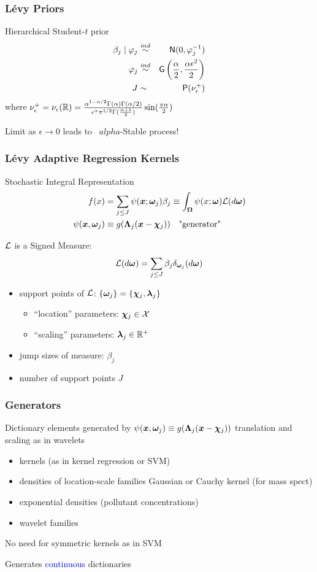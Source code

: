 \documentclass[dvips]{beamer}
\newcommand{\bs}[2]{\begin{frame} \frametitle{#1} 
{#2}
\end{frame} }
\newcommand{\blue}{\textcolor{Blue}}
\begin{document}
\bs{L\'evy Priors} {
Hierarchical Student-$t$ prior
\begin{eqnarray*}
  \beta_j \mid \varphi_j & \mathrel{\mathop{\sim}\limits^{\mathit{ind}}} & \textsf{N}(0,  \varphi_j^{-1}) \\
  \varphi_j    & \mathrel{\mathop{\sim}\limits^{\mathit{ind}}} & \mbox{\sf G}\left(\frac{\alpha}{2}, \frac{\alpha \epsilon^2}{2}\right) \\
   J & \sim & \mbox{\sf P}(\nu^+_\epsilon)
\end{eqnarray*}
where $\nu^+_\epsilon = \nu_\epsilon(\mathbb{R}) = \frac{\alpha ^{1
    - \alpha/2} \Gamma(\alpha)\Gamma(\alpha/2)}{\epsilon^\alpha
  \pi^{1/2} \Gamma(\frac{\alpha +1}{2})} \sin(\frac{\pi \alpha} {2})$

\vspace{.5in}
Limit as $\epsilon \to 0$ leads to \Levy\ $alpha$-Stable process!
}

\bs{L\'evy Adaptive Regression Kernels} {
Stochastic Integral Representation 
\begin{align*}
f(x)   & =   \sum_{j\le J}\psi(\bm x; \bm \omega_j) \beta_j \equiv \int_{\bm \Omega}  
\psi(x;\bm \omega) {\cal L}(d\bm \omega) \\
\psi(\bm x,\bm \omega_j) & \equiv g( \bm \Lambda_j (\bm x - \bm \chi_j))
\quad \text{"generator"}
\end{align*} 


${\cal L}$ is a Signed Measure:
$${\cal L}(d\bm \omega)  = \sum_{j\le J} \beta_j \delta_{\bm \omega_j}(d\bm \omega) $$

  \begin{itemize}
 
  \item  support points of ${\cal L}$: $\{\bm \omega_j\} = \{\bm \chi_j,\bm \lambda_j\}$ 
    \begin{itemize}
    \item``location'' parameters:  $\bm \chi_j\in\mathcal{X}$  
    \item ``scaling'' parameters:  $\bm \lambda_j\in\mathbb{R}^+$  
    \end{itemize} 
  \item jump sizes of measure:  $\beta_j$   
  \item number of support points  $J$ 
  \end{itemize}
} 

\bs{Generators} {
Dictionary elements generated by $\psi(\bm x,\bm \omega_j)  \equiv g(
\bm \Lambda_j (\bm x - \bm \chi_j))$ translation and scaling as in wavelets
  \begin{itemize}
  \item kernels  (as in kernel regression or SVM)
  \item densities of location-scale families  Gaussian or Cauchy
    kernel (for mass spect)
  \item exponential densities  (pollutant concentrations) 
  \item wavelet families
  \end{itemize}
No need for symmetric kernels as in SVM

Generates \blue{continuous} dictionaries
}
\end{document}
